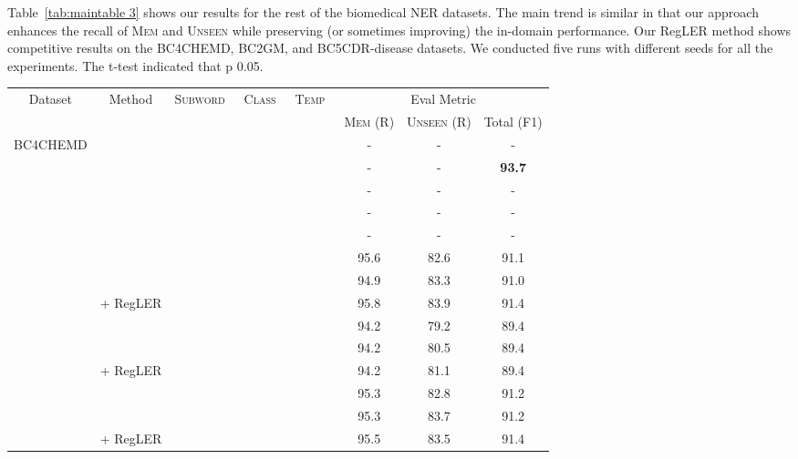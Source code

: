 \documentclass[11pt]{article}
\newcommand{\cmark}{\ding{51}}\newcommand{\xmark}{\ding{55}}\newcommand{\cross}{\ding{61}}\newcommand{\mb}[1]{\textcolor{red}{#1}}
\begin{document}
Table~\ref{tab:maintable 3} shows our results for the rest of the biomedical NER datasets.
The main trend is similar in that our approach enhances the recall of \textsc{Mem} and \textsc{Unseen} while preserving (or sometimes improving) the in-domain performance.
Our RegLER method shows competitive results on the BC4CHEMD, BC2GM, and BC5CDR-disease datasets.
We conducted five runs with different seeds for all the experiments. The t-test indicated that p  0.05.

\begin{table*}[t]
\centering
\begin{adjustbox}{width=0.75\textwidth}
\begin{tabular}{ l l c c c c c c }
\toprule
\multicolumn{1}{c}{\multirow{2}{*}{Dataset}} & \multicolumn{1}{c}{\multirow{2}{*}{Method}} & \multicolumn{1}{c}{\multirow{2}{*}{\textsc{Subword}~}} & \multicolumn{1}{c}{\multirow{2}{*}{\textsc{Class}~}} &
\multicolumn{1}{c}{\multirow{2}{*}{\textsc{Temp}~}} & \multicolumn{3}{c}{Eval Metric}       \\ \cmidrule{6-8} 
\multicolumn{1}{c}{} & & & & & 
\textsc{Mem} (R) & 
\textsc{Unseen} (R) & 
Total (F1) \\ \midrule
\multirow{21}{*}{BC4CHEMD}                   
&  & \xmark & \xmark & \xmark & - & - & - \\
&  & \xmark & \xmark & \xmark & - & - & \textbf{93.7} \\
&  & \xmark & \xmark & \xmark & - & - & -  \\
&  & \xmark & \xmark & \xmark & - & - & -  \\
&  & \xmark & \xmark & \xmark & - & - & - \\
\cmidrule{2-8}
&  & \xmark & \xmark & \xmark & 95.6 & 82.6 & 91.1 \\
&  & \xmark & \xmark & \xmark & 94.9 & 83.3 & 91.0 \\
&  + RegLER & \cmark & \cmark & \cmark & 95.8 & 83.9 & 91.4 \\
\cmidrule{2-8}
&  & \xmark & \xmark & \xmark & 94.2 & 79.2 & 89.4 \\
&  & \xmark & \xmark & \xmark & 94.2 & 80.5 & 89.4 \\
&  + RegLER & \cmark & \cmark & \cmark & 94.2 & 81.1 & 89.4 \\
\cmidrule{2-8}
&  & \xmark & \xmark & \xmark & 95.3 & 82.8 & 91.2 \\
&  & \xmark & \xmark & \xmark & 95.3 & 83.7 & 91.2 \\
&  + RegLER & \cmark & \cmark & \cmark & 95.5 & 83.5 & 91.4 \\

\end{tabular}
\end{adjustbox}
\end{table*}
\end{document}
